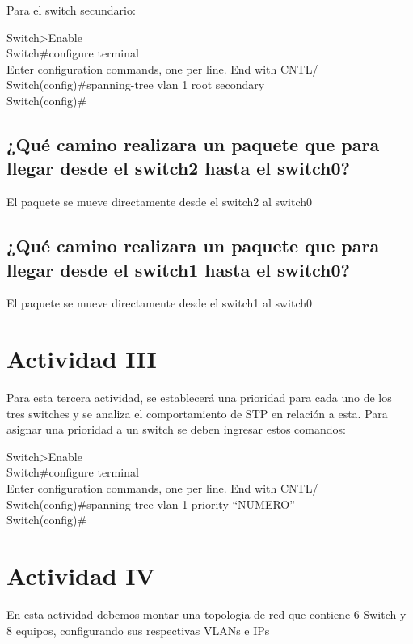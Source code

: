 ﻿\documentclass[spanish]{udpreport}
\begin{document}
Para el switch secundario:

\begin{flushleft}
	Switch>Enable \\
	Switch\#configure terminal\\
	Enter configuration commands, one per line. End with CNTL/\\
	Switch(config)\#spanning-tree vlan 1 root secondary\\
	Switch(config)\#\\
\end{flushleft}


\subsection{¿Qué camino realizara un paquete que para llegar desde el switch2 hasta el switch0?}
El paquete se mueve directamente desde el switch2 al switch0
\subsection{¿Qué camino realizara un paquete que para llegar desde el switch1 hasta el switch0?}
El paquete se mueve directamente desde el switch1 al switch0


\section{Actividad III}
Para esta tercera actividad, se establecerá una prioridad para cada uno de los tres switches y se analiza el comportamiento de STP en relación a esta. Para asignar una prioridad a un switch se deben ingresar estos comandos:

\begin{flushleft}	
	Switch>Enable\\
	Switch\#configure terminal\\
	Enter configuration commands, one per line. End with CNTL/\\
	Switch(config)\#spanning-tree vlan 1 priority “NUMERO”\\
	Switch(config)\#	\\
\end{flushleft}


\section{Actividad IV}

En esta actividad debemos montar una topologia de red que contiene 6 Switch y 8 equipos, configurando sus respectivas VLANs e IPs
\end{document}
